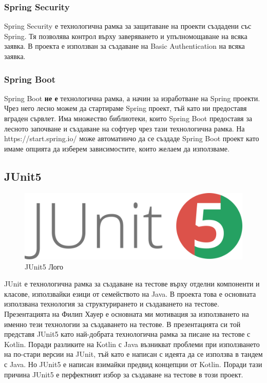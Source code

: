        \subsubsection{Spring Security}
            Spring Security е технологична рамка за защитаване на проекти създадени със Spring. Тя позволява контрол върху заверяването и упълномощаване на всяка заявка. В проекта е използван за създаване на Basic Authentication на всяка заявка.
            
            \subsubsection{Spring Boot}
        Spring Boot \textbf{не е} технологична рамка, а начин за изработване на Spring проекти. Чрез него лесно можем да стартираме Spring проект, тъй като ни предоставя вграден сървлет. Има множество библиотеки, които Spring Boot предоставя за лесното започване и създаване на софтуер чрез тази технологична рамка. На https://start.spring.io/ може автоматинчо да се създаде Spring Boot проект като имаме опцията да изберем зависимостите, които желаем да използваме. 
    
    \subsection{JUnit5}
    \begin{figure}[h]
        \centering
        \includegraphics{images/junit5.png}
        \caption{JUnit5 Лого}
        \label{fig:junit5_logo}
    \end{figure}
    
    JUnit е технологична рамка за създаване на тестове върху отделни компоненти и класове, използвайки езици от семейството на Java. В проекта това е основната използвана технология за структурирането и създаването на тестове. Презентацията на Филип Хауер е основната ми мотивация за използването на именно тези технологии за създаването на тестове\parencite{Testing}. В презентацията си той представя JUnit5 като най-добрата технологична рамка за писане на тестове с Kotlin. Поради разликите на Kotlin с Java възникват проблеми при използването на по-стари версии на JUnit, тъй като е написан с идеята да се използва в тандем с Java. Но JUnit5 е написан взимайки предвид концепции от Kotlin. Поради тази причина JUnit5 е перфектният избор за създаване на тестове в този проект.
    
